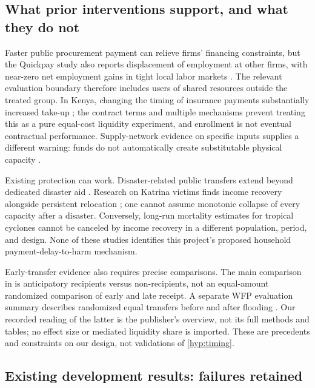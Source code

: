 \documentclass[11pt,a4paper]{article}
\numberwithin{equation}{section}
\theoremstyle{definition}
\theoremstyle{plain}
\theoremstyle{remark}
\begin{document}
\subsection{What prior interventions support, and what they do not}

Faster public procurement payment can relieve firms' financing constraints, but the Quickpay study also reports displacement of employment at other firms, with near-zero net employment gains in tight local labor markets \citep{barrotnanda2020}. The relevant evaluation boundary therefore includes users of shared resources outside the treated group. In Kenya, changing the timing of insurance payments substantially increased take-up \citep{casaburiwillis2018}; the contract terms and multiple mechanisms prevent treating this as a pure equal-cost liquidity experiment, and enrollment is not eventual contractual performance. Supply-network evidence on specific inputs supplies a different warning: funds do not automatically create substitutable physical capacity \citep{barrotsauvagnat2016}.

Existing protection can work. Disaster-related public transfers extend beyond dedicated disaster aid \citep{deryugina2017}. Research on Katrina victims finds income recovery alongside persistent relocation \citep{deryugina2018}; one cannot assume monotonic collapse of every capacity after a disaster. Conversely, long-run mortality estimates for tropical cyclones \citep{younghsiang2024} cannot be canceled by income recovery in a different population, period, and design. None of these studies identifies this project's proposed household payment-delay-to-harm mechanism.

Early-transfer evidence also requires precise comparisons. The main comparison in \citet{pople2026} is anticipatory recipients versus non-recipients, not an equal-amount randomized comparison of early and late receipt. A separate WFP evaluation summary describes randomized equal transfers before and after flooding \citep{wfp2026}. Our recorded reading of the latter is the publisher's overview, not its full methods and tables; no effect size or mediated liquidity share is imported. These are precedents and constraints on our design, not validations of \cref{hyp:timing}.

\subsection{Existing development results: failures retained}
\label{sec:development}
\end{document}
